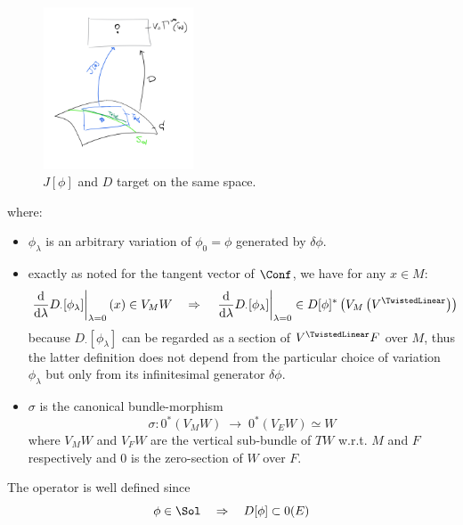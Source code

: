 \documentclass[a4paper,12pt]{scrartcl}  %
\begin{document}
\begin{figure}
\centering
\includegraphics[width=0.40\textwidth]{Pictures/jacobi.png}
\caption{\footnotesize \label{fig:jacobi}$J[\phi]$ and $D$ target on the same space.}
\end{figure}
where:
\begin{itemize}
	\item $\phi_\lambda$ is an arbitrary variation of $\phi_0 = \phi$ generated by $\delta\phi$.
	\item exactly as noted for the tangent vector of $\Conf$, we have for any $x\in M$:
		\begin{displaymath}
			\left.\dfrac{\textrm{d}}{\textrm{d} \lambda} D_\cdot [\phi_\lambda]\right\rvert_{\lambda=0}(x) \in V_M W
			\quad \Rightarrow \quad
			\left.\dfrac{\textrm{d}}{\textrm{d} \lambda} D_\cdot [\phi_\lambda]\right\rvert_{\lambda=0} \in D[\phi]^\ast \left( V_M \left( V^\TwistedLinear \right)\right)
		\end{displaymath}
		because $D_\cdot[\phi_\lambda]$ can be regarded as a section of $V^\TwistedLinear F$ over $M$, 
		thus the latter definition does not depend from the particular choice of variation $\phi_\lambda$ 
		but only from its infinitesimal generator $\delta\phi$.
	\item $\sigma$ is the canonical bundle-morphism
		\begin{displaymath}
			\sigma:  0^\ast \left( V_M W \right)  \; \rightarrow \;  0^\ast \left(V_E W \right) \simeq W
		\end{displaymath}
		 where $V_M W$ and $V_F W$ are the vertical sub-bundle of $T W$ w.r.t. $M$ and $F$ respectively 
		 and $0$ is the zero-section of $W$ over $F$.
\end{itemize}

The operator is well defined since
\begin{displaymath}
	\phi \in \Sol \quad \Rightarrow \quad D[\phi] \subset 0(E)
\end{displaymath}
\end{document}
